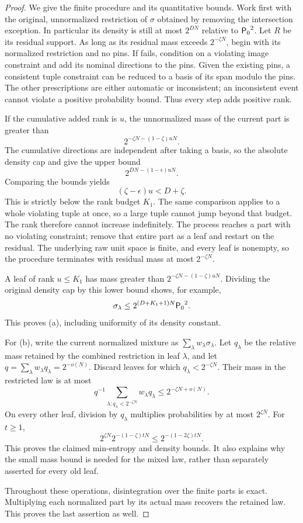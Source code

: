 \begin{proof}
We give the finite procedure and its quantitative bounds.
Work first with the original, unnormalized restriction of \(\sigma\) obtained by removing the intersection exception.
In particular its density is still at most \(2^{DN}\) relative to \({\mathsf P_0}^2\).
Let \(R\) be its residual support.
As long as its residual mass exceeds \(2^{-\zeta N}\), begin with its normalized restriction and no pins.
If  fails, condition on a violating image constraint and add its nominal directions to the pins.
Given the existing pins, a consistent tuple constraint can be reduced to a basis of its span modulo the pins.
The other prescriptions are either automatic or inconsistent; an inconsistent event cannot violate a positive probability bound.
Thus every step adds positive rank.

If the cumulative added rank is \(u\), the unnormalized mass of the current part is greater than
\[
 2^{-\zeta N-(1-\zeta)uN}.
\]
The cumulative directions are independent after taking a basis, so the absolute density cap and  give the upper bound
\[
 2^{DN-(1-\epsilon)uN}.
\]
Comparing the bounds yields
\begin{equation}\label{eq:peeling-rank-comparison}
 (\zeta-\epsilon)u<D+\zeta.
\end{equation}
This is strictly below the rank budget \(K_1\).
The same comparison applies to a whole violating tuple at once, so a large tuple cannot jump beyond that budget.
The rank therefore cannot increase indefinitely.
The process reaches a part with no violating constraint; remove that entire part as a leaf and restart on the residual.
The underlying raw unit space is finite, and every leaf is nonempty, so the procedure terminates with residual mass at most \(2^{-\zeta N}\).

A leaf of rank \(u\le K_1\) has mass greater than
\(2^{-\zeta N-(1-\zeta)uN}\).
Dividing the original density cap by this lower bound shows, for example,
\[
 \sigma_\lambda\le
 2^{(D+K_1+1)N}{\mathsf P_0}^2.
\]
This proves (a), including uniformity of its density constant.

For (b), write the current normalized mixture as
\(\sum_\lambda w_\lambda\sigma_\lambda\).
Let \(q_\lambda\) be the relative mass retained by the combined restriction in leaf \(\lambda\), and let
\(q=\sum_\lambda w_\lambda q_\lambda=2^{-o(N)}\).
Discard leaves for which \(q_\lambda<2^{-\zeta N}\).
Their mass in the restricted law is at most
\[
 q^{-1}\sum_{\lambda:q_\lambda<2^{-\zeta N}}
       w_\lambda q_\lambda
 \le 2^{-\zeta N+o(N)}.
\]
On every other leaf, division by \(q_\lambda\) multiplies probabilities by at most \(2^{\zeta N}\).
For \(t\ge1\),
\[
 2^{\zeta N}2^{-(1-\zeta)tN}
 \le2^{-(1-2\zeta)tN}.
\]
This proves the claimed min-entropy and density bounds.
It also explains why the small mass bound is needed for the mixed law, rather than separately asserted for every old leaf.

Throughout these operations, disintegration over the finite parts is exact.
Multiplying each normalized part by its actual mass recovers the retained law.
This proves the last assertion as well.
\end{proof}

